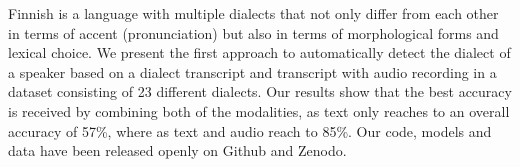 Finnish is a language with multiple dialects that not only differ from each other in terms of accent (pronunciation) but also in terms of morphological forms and lexical choice. We present the first approach to automatically detect the dialect of a speaker based on a dialect transcript and transcript with audio recording in a dataset consisting of 23 different dialects. Our results show that the best accuracy is received by combining both of the modalities, as text only reaches to an overall accuracy of 57\%, where as text and audio reach to 85\%. Our code, models and data have been released openly on Github and Zenodo.
